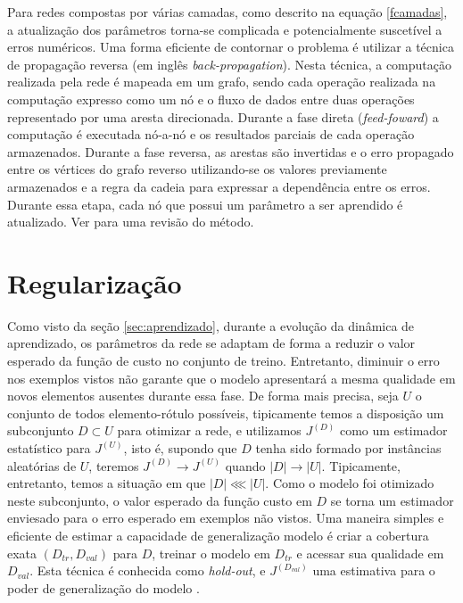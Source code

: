 Para redes compostas por várias camadas, como descrito na equação \ref{fcamadas}, a atualização dos parâmetros torna-se complicada e potencialmente suscetível a erros numéricos. Uma forma eficiente de contornar o problema é utilizar a técnica de propagação reversa (em inglês \textit{back-propagation}). Nesta técnica, a computação realizada pela rede é mapeada em um grafo, sendo cada operação realizada na computação expresso como um nó e o fluxo de dados entre duas operações representado por uma aresta direcionada. Durante a fase direta (\textit{feed-foward}) a computação é executada nó-a-nó e os resultados parciais de cada operação armazenados. Durante a fase reversa, as arestas são invertidas e o erro propagado entre os vértices do grafo reverso utilizando-se os valores previamente armazenados e a regra da cadeia para expressar a dependência entre os erros. Durante essa etapa, cada nó que possui um parâmetro a ser aprendido é atualizado. Ver \cite{jurgenReview2015} para uma revisão do método.


\section{Regularização}

Como visto da seção \ref{sec:aprendizado}, durante a evolução da dinâmica de aprendizado, os parâmetros da rede se adaptam de forma a reduzir o valor esperado da função de custo no conjunto de treino. Entretanto, diminuir o erro nos exemplos vistos não garante que o modelo apresentará a mesma qualidade em novos elementos ausentes durante essa fase. De forma mais precisa, seja $U$ o conjunto de todos elemento-rótulo possíveis, tipicamente temos a disposição um subconjunto $D \subset U$ para otimizar a rede, e utilizamos $J^{(D)}$ como um estimador estatístico para $J^{(U)}$, isto é, supondo que $D$ tenha sido formado por instâncias aleatórias de $U$, teremos $J^{(D)} \rightarrow J^{(U)}$ quando $|D| \rightarrow |U|$. Tipicamente, entretanto, temos a situação em que $|D| \lll |U|$. Como o modelo foi otimizado neste subconjunto, o valor esperado da função custo em $D$ se torna um estimador enviesado para o erro esperado em exemplos não vistos. Uma maneira simples e eficiente de estimar a capacidade de generalização modelo é criar a cobertura exata $(D_{tr}, D_{val})$ para $D$, treinar o modelo em $D_{tr}$ e acessar sua qualidade em $D_{val}$. Esta técnica é conhecida como \textit{hold-out}, e $J^{(D_{val})}$ uma estimativa para o poder de generalização do modelo \cite{friedman2001elements}.

